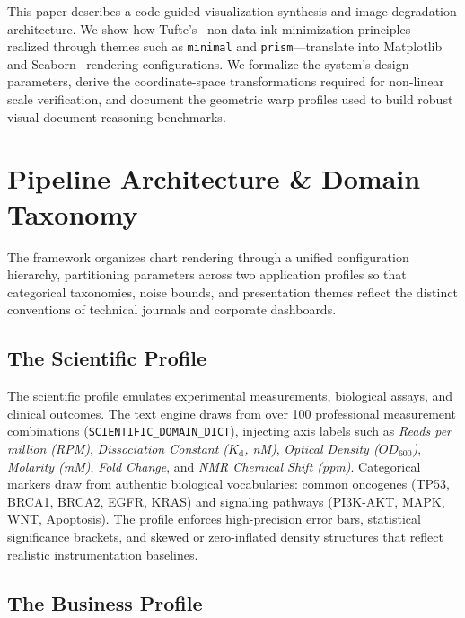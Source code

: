 \documentclass[11pt,twocolumn]{article}
\begin{document}
This paper describes a code-guided visualization synthesis and image degradation architecture.
We show how Tufte's~\cite{tufte2001} non-data-ink minimization principles---realized through themes such as \texttt{minimal} and \texttt{prism}---translate into Matplotlib~\cite{hunter2007matplotlib} and Seaborn~\cite{waskom2021seaborn} rendering configurations.
We formalize the system's design parameters, derive the coordinate-space transformations required for non-linear scale verification, and document the geometric warp profiles used to build robust visual document reasoning benchmarks.

\section{Pipeline Architecture \& Domain Taxonomy}\label{sec:architecture}

The framework organizes chart rendering through a unified configuration hierarchy, partitioning parameters across two application profiles so that categorical taxonomies, noise bounds, and presentation themes reflect the distinct conventions of technical journals and corporate dashboards.

\subsection{The Scientific Profile}\label{sec:scientific}

The scientific profile emulates experimental measurements, biological assays, and clinical outcomes.
The text engine draws from over 100 professional measurement combinations (\texttt{SCIENTIFIC\_DOMAIN\_DICT}), injecting axis labels such as \emph{Reads per million (RPM)}, \emph{Dissociation Constant ($K_{\text{d}}$, nM)}, \emph{Optical Density ($OD_{600}$)}, \emph{Molarity (mM)}, \emph{Fold Change}, and \emph{NMR Chemical Shift (ppm)}.
Categorical markers draw from authentic biological vocabularies: common oncogenes (TP53, BRCA1, BRCA2, EGFR, KRAS) and signaling pathways (PI3K-AKT, MAPK, WNT, Apoptosis).
The profile enforces high-precision error bars, statistical significance brackets, and skewed or zero-inflated density structures that reflect realistic instrumentation baselines.

\subsection{The Business Profile}\label{sec:business}
\end{document}
